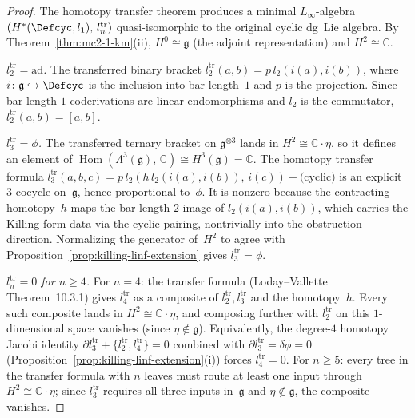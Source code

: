 \begin{proof}
The homotopy transfer theorem produces a minimal $L_\infty$-algebra
$(H^*(\Defcyc, l_1),\, l_n^{\mathrm{tr}})$ quasi-isomorphic to the
original cyclic dg~Lie algebra. By
Theorem~\ref{thm:mc2-1-km}(ii), $H^0 \cong \mathfrak{g}$ (the
adjoint representation) and $H^2 \cong \mathbb{C}$.

\emph{$l_2^{\mathrm{tr}} = \mathrm{ad}$.}
The transferred binary bracket $l_2^{\mathrm{tr}}(a,b) =
p\,l_2(i(a), i(b))$, where $i\colon \mathfrak{g} \hookrightarrow
\Defcyc$ is the inclusion into bar-length~$1$ and $p$ is the
projection. Since bar-length-$1$ coderivations are linear
endomorphisms and $l_2$ is the commutator, $l_2^{\mathrm{tr}}(a,b)
= [a,b]$.

\emph{$l_3^{\mathrm{tr}} = \phi$.}
The transferred ternary bracket on $\mathfrak{g}^{\otimes 3}$
lands in $H^2 \cong \mathbb{C}\cdot\eta$, so it defines an element of
$\operatorname{Hom}(\Lambda^3(\mathfrak{g}),\, \mathbb{C})
\cong H^3(\mathfrak{g}) = \mathbb{C}$.
The homotopy transfer formula
$l_3^{\mathrm{tr}}(a,b,c) = p\,l_2(h\,l_2(i(a),i(b)),\, i(c))
+ \text{(cyclic)}$
is an explicit $3$-cocycle on~$\mathfrak{g}$, hence proportional
to~$\phi$. It is nonzero because the contracting homotopy~$h$
maps the bar-length-$2$ image of $l_2(i(a),i(b))$, which carries
the Killing-form data via the cyclic pairing, nontrivially
into the obstruction direction.
Normalizing the generator of~$H^2$ to agree with
Proposition~\ref{prop:killing-linf-extension}
gives $l_3^{\mathrm{tr}} = \phi$.

\emph{$l_n^{\mathrm{tr}} = 0$ for $n \geq 4$.}
For $n = 4$: the transfer formula
(Loday--Vallette \cite{LV12} Theorem~10.3.1) gives
$l_4^{\mathrm{tr}}$ as a composite of $l_2^{\mathrm{tr}}, l_3^{\mathrm{tr}}$
and the homotopy~$h$. Every such composite lands in
$H^2 \cong \mathbb{C}\cdot\eta$, and composing further with
$l_2^{\mathrm{tr}}$ on this $1$-dimensional space vanishes
(since $\eta \notin \mathfrak{g}$). Equivalently, the degree-$4$
homotopy Jacobi identity $\partial l_3^{\mathrm{tr}} +
\{l_2^{\mathrm{tr}}, l_4^{\mathrm{tr}}\} = 0$ combined with
$\partial l_3^{\mathrm{tr}} = \delta\phi = 0$
(Proposition~\ref{prop:killing-linf-extension}(i)) forces
$l_4^{\mathrm{tr}} = 0$.
For $n \geq 5$: every tree in the transfer formula with $n$ leaves
must route at least one input through $H^2 \cong \mathbb{C}\cdot\eta$;
since $l_3^{\mathrm{tr}}$ requires all three inputs in~$\mathfrak{g}$
and $\eta \notin \mathfrak{g}$, the composite vanishes.
\end{proof}

